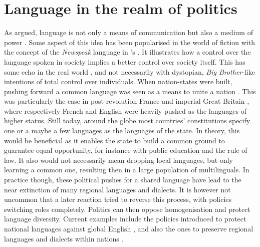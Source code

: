 \documentclass[../thesis.tex]{subfiles}
\begin{document}
\section{Language in the realm of politics}
As  argued, language is not only a
means of communication but also a medium of power \cite{BourdieuLanguageSymbolic2009}.
Some aspect of this idea has been popularised in the world of fiction with the concept
of the \emph{Newspeak} language in 's
 \cite{Orwell19841950}. It illustrates how a control over the
language spoken in society implies a better control over society itself. This has some
echo in the real world \cite{FowlerLanguageControl1979}, and not necessarily with
dystopian, \emph{Big Brother}-like intentions of total control over individuals. When
nation-states were built, pushing forward a common language was seen as a means to unite a nation
\cite{WrightCommunityCommunication2000}. This was particularly the case in
post-revolution France and imperial Great Britain
\cite{GrilloDominantLanguages1989,HigonnetPoliticsLinguistic1980}, where respectively
French and English were heavily pushed as the languages of higher status. Still today,
around the globe most countries' constitutions specify one or a maybe a few languages as
the languages of the state. In theory, this would be beneficial as it enables the state
to build a common ground to guarantee equal opportunity, for instance with public
education and the rule of law. It also would not necessarily mean dropping local
languages, but only learning a common one, resulting then in a large population of
multilinguals. In practice though, these political pushes for a shared language have
lead to the near extinction of many regional languages and dialects. It is however not
uncommon that a later reaction tried to reverse this process, with policies switching
roles completely. Politics can then oppose homogenisation and protect language
diversity. Current examples include the policies introduced to protect national
languages against global English \cite{SonntagLocalPolitics2003}, and also the ones to
preserve regional languages and dialects within nations
\cite{KaplanLanguagePlanning1997}.
\end{document}
